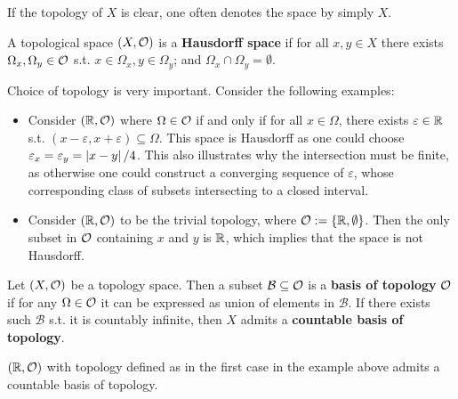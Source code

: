 \documentclass{article}
\begin{document}
\begin{remark}
    If the topology of $X$ is clear, one often denotes the space by simply $X$. 
\end{remark}

\begin{definition}
    A topological space $(X, \mathcal{O})$ is a \textbf{Hausdorff space} if for all $x, y \in X$ there exists $\Omega_x, \Omega_y \in \mathcal{O}$ s.t. $x \in \Omega_x, y \in \Omega_y$; and $\Omega_x \cap \Omega_y = \emptyset$.
\end{definition}

\begin{example}
    Choice of topology is very important. Consider the following examples:
    \begin{itemize}
        \item Consider $(\mathbb{R}, \mathcal{O})$ where $\Omega \in \mathcal{O}$ if and only if for all $x \in \Omega$, there exists $\varepsilon \in \mathbb{R}$ s.t. $(x - \varepsilon, x + \varepsilon) \subseteq \Omega$. This space is Hausdorff as one could choose $\varepsilon_x = \varepsilon_y = \left|x - y\right|/4$. This also illustrates why the intersection must be finite, as otherwise one could construct a converging sequence of $\varepsilon$, whose corresponding class of subsets intersecting to a closed interval.
        \item Consider $(\mathbb{R}, \mathcal{O})$ to be the trivial topology, where $\mathcal{O} := \{\mathbb{R}, \emptyset\}$. Then the only subset in $\mathcal{O}$ containing $x$ and $y$ is $\mathbb{R}$, which implies that the space is not Hausdorff.
    \end{itemize}
\end{example}

\begin{definition}
    Let $(X, \mathcal{O})$ be a topology space. Then a subset $\mathcal{B} \subseteq \mathcal{O}$ is a \textbf{basis of topology} $\mathcal{O}$ if for any $\Omega \in \mathcal{O}$ it can be expressed as union of elements in $\mathcal{B}$. If there exists such $\mathcal{B}$ s.t. it is countably infinite, then $X$ admits a \textbf{countable basis of topology}.
\end{definition}

\begin{proposition}
    $(\mathbb{R}, \mathcal{O})$ with topology defined as in the first case in the example above admits a countable basis of topology.
\end{proposition}
\end{document}
